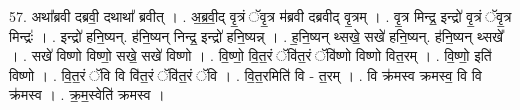 \documentclass[17pt]{extarticle}
\begin{document}
57. अथा᳚ब्रवी दब्रवी॒ दथाथा᳚ ब्रवीत् । . अ॒ब्र॒वी॒द् वृ॒त्रं ॅवृ॒त्र म॑ब्रवी दब्रवीद् वृ॒त्रम् । . वृ॒त्र मिन्द्र॒ इन्द्रो॑ वृ॒त्रं ॅवृ॒त्र मिन्द्रः॑ । . इन्द्रो॑ हनि॒ष्यन्. ह॑नि॒ष्यन् निन्द्र॒ इन्द्रो॑ हनि॒ष्यन्न् । . ह॒नि॒ष्यन् थ्सखे॒ सखे॑ हनि॒ष्यन्. ह॑नि॒ष्यन् थ्सखे᳚ । . सखे॑ विष्णो विष्णो॒ सखे॒ सखे॑ विष्णो । . वि॒ष्णो॒ वि॒त॒रं ॅवि॑त॒रं ॅवि॑ष्णो विष्णो वित॒रम् । . वि॒ष्णो॒ इति॑ विष्णो । . वि॒त॒रं ॅवि वि वि॑त॒रं ॅवि॑त॒रं ॅवि । . वि॒त॒रमिति॑ वि - त॒रम् । . वि क्र॑मस्व क्रमस्व॒ वि वि क्र॑मस्व । . क्र॒म॒स्वेति॑ क्रमस्व । \newline
\end{document}
